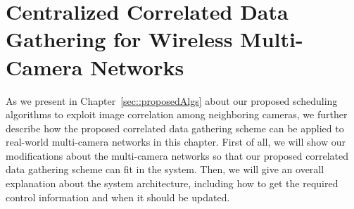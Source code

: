 \section{Centralized Correlated Data Gathering for Wireless Multi-Camera Networks}
\label{sec::protocolDesign}
As we present in Chapter~\ref{sec::proposedAlgs} about our proposed scheduling algorithms to exploit image correlation among neighboring cameras, we further describe how the proposed correlated data gathering scheme can be applied to real-world multi-camera networks in this chapter.
First of all, we will show our modifications about the multi-camera networks so that our proposed correlated data gathering scheme can fit in the system.
Then, we will give an overall explanation about the system architecture, including how to get the required control information and when it should be updated.
%
%
